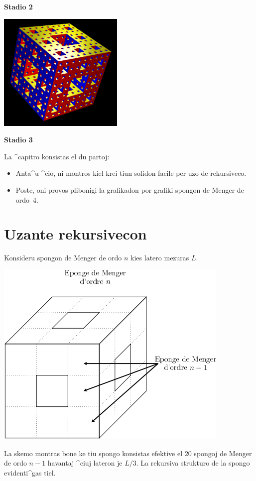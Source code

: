 \begin{center}
\begin{minipage}{6cm}
    \begin{center}
      \textbf{Stadio 2}
    \end{center}
  \end{minipage}
  \begin{minipage}{6cm}
    \includegraphics[width=6cm]{bildoj/menger3.png}
    \begin{center}
      \textbf{Stadio 3}
    \end{center}
  \end{minipage}
\end{center}

La ^capitro konsistas el du partoj:
\begin{itemize}
\item Anta^u ^cio, ni montros kiel krei tiun solidon facile per uzo
  de rekursiveco.
\item Poste, oni provos plibonigi la grafikadon por grafiki spongon de
  Menger de ordo~4.
\end{itemize}

\section{Uzante rekursivecon}

Konsideru spongon de Menger de ordo $n$ kies latero mezuras $L$.\\
\begin{center}
\includegraphics{bildoj/menger-schema01.png}
\end{center}
La skemo montras bone ke tiu spongo konsistas efektive el $20$ spongoj
de Menger de ordo $n-1$ havantaj ^ciuj lateron je ${L}/{3}$.  La
rekursiva strukturo de la spongo evidenti^gas tiel.

